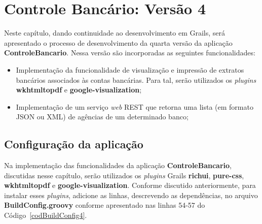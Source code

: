 \chapter{Controle Bancário: Versão 4}\label{interface}

Neste  capítulo,   dando  continuidade   ao  desenvolvimento  em   Grails,  será
apresentado o  processo de  desenvolvimento da quarta  versão da  aplicação {\bf
  ControleBancario}. Nessa versão são incorporadas as seguintes funcionalidades:

\begin{itemize}

\vspace{0.5cm}

\item Implementação  da funcionalidade de  visualização e impressão  de extratos
  bancários associados às  contas bancárias. Para tal, serão  utilizados os {\it
    plugins} {\bf wkhtmltopdf} e {\bf google-visualization};

\vspace{0.5cm}

\item  Implementação de  um serviço  {\it web}  REST que  retorna uma  lista (em
  formato JSON ou XML) de agências de um determinado banco; 

\end{itemize}

\section{Configuração da aplicação} 

\vspace{0.5cm}

    Na   implementação   das
funcionalidades da aplicação  {\bf ControleBancario}, discutidas nesse capítulo,
serão  utilizados os  {\it plugins}  Grails {\bf  richui}, {\bf  pure-css}, {\bf
  wkhtmltopdf} e  {\bf google-visualization}. Conforme  discutido anteriormente,
para  instalar   esses  {\it  plugins},  adicione  as   linhas,  descrevendo  as
dependências,  no  arquivo  {\bf  BuildConfig.groovy} conforme  apresentado  nas
linhas 54-57 do Código~\ref{codBuildConfig4}.  

\newpage

